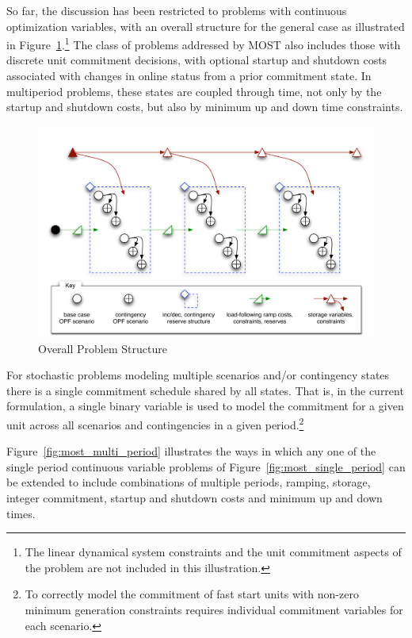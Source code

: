\documentclass[12pt]{article}
\newcommand{\most}[0]{{MOST}}
\numberwithin{equation}{section}
\numberwithin{table}{section}
\numberwithin{figure}{section}
\begin{document}
So far, the discussion has been restricted to problems with continuous optimization variables, with an overall structure for the general case as illustrated in Figure~\ref{fig:structure}.\footnote{The linear dynamical system constraints and the unit commitment aspects of the problem are not included in this illustration.} The class of problems addressed by \most{} also includes those with discrete unit commitment decisions, with optional startup and shutdown costs associated with changes in online status from a prior commitment state. In multiperiod problems, these states are coupled through time, not only by the startup and shutdown costs, but also by minimum up and down time constraints.

\begin{figure}[hbtp]
  \centering
  \includegraphics[width=\textwidth]{./figures/structure-multi-period}
  \caption{Overall Problem Structure}
  \label{fig:structure}
\end{figure}

For stochastic problems modeling multiple scenarios and/or contingency states there is a single commitment schedule shared by all states. That is, in the current formulation, a single binary variable is used to model the commitment for a given unit across all scenarios and contingencies in a given period.\footnote{To correctly model the commitment of fast start units with non-zero minimum generation constraints requires individual commitment variables for each scenario.}

Figure~\ref{fig:most_multi_period} illustrates the ways in which any one of the single period continuous variable problems of Figure~\ref{fig:most_single_period} can be extended to include combinations of multiple periods, ramping, storage, integer commitment, startup and shutdown costs and minimum up and down times. 
\end{document}
